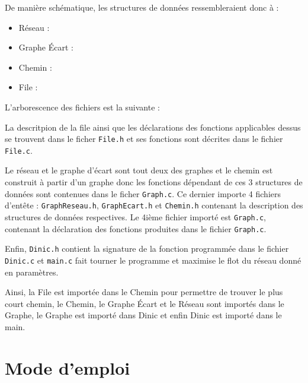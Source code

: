 \documentclass[11pt, a4paper]{report}
\begin{document}
	De manière schématique, les structures de données ressembleraient donc à :
	\begin{itemize}
        \item Réseau :\\
        \item Graphe Écart :\\
        \item Chemin :\\
        \item File :\\
	\end{itemize}
	
	L'arborescence des fichiers est la suivante :
	
	
	La descritpion de la file ainsi que les déclarations des fonctions applicables dessus se trouvent dans le ficher \verb|File.h| et ses fonctions sont décrites dans le fichier \verb|File.c|.
	
	Le réseau et le graphe d'écart sont tout deux des graphes et le chemin est construit à partir d'un graphe donc les fonctions dépendant de ces 3 structures de données sont contenues dans le ficher \verb|Graph.c|. Ce dernier importe 4 fichiers d'entête : \verb|GraphReseau.h|, \verb|GraphEcart.h| et \verb|Chemin.h| contenant la description des structures de données respectives. Le 4ième fichier importé est \verb|Graph.c|, contenant la déclaration des fonctions produites dans le fichier \verb|Graph.c|.
	
	Enfin, \verb|Dinic.h| contient la signature de la fonction programmée dans le fichier \verb|Dinic.c| et \verb|main.c| fait tourner le programme et maximise le flot du réseau donné en paramètres.
	
	Ainsi, la File est importée dans le Chemin pour permettre de trouver le plus court chemin, le Chemin, le Graphe Écart et le Réseau sont importés dans le Graphe, le Graphe est importé dans Dinic et enfin Dinic est importé dans le main.
	
	\chapter{Mode d'emploi}
	
\end{document}
